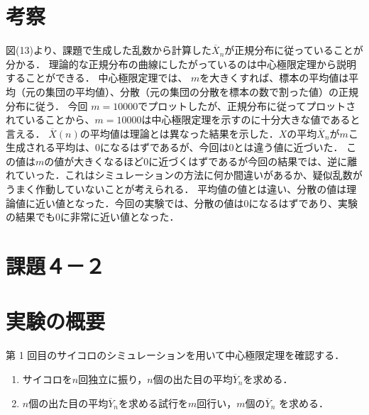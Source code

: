 \documentclass[fleqn, a4paper. 12pt]{ltjsarticle} %
\begin{document}
\section*{考察}
図(13)より、課題で生成した乱数から計算した$\overline{X}_n$が正規分布に従っていることが分かる．
理論的な正規分布の曲線にしたがっているのは中心極限定理から説明することができる．
中心極限定理では、 $m$を大きくすれば、標本の平均値は平均（元の集団の平均値）、分散（元の集団の分散を標本の数で割った値）の正規分布に従う．
今回 $m= 10000$でプロットしたが、正規分布に従ってプロットされていることから、$m=10000$は中心極限定理を示すのに十分大きな値であると言える．
$\overline{X}(n)$の平均値は理論とは異なった結果を示した．$X$の平均$\overline{X}_n$が$m$こ生成される平均は、$0$になるはずであるが、今回は$0$とは違う値に近づいた．
この値は$m$の値が大きくなるほど$0$に近づくはずであるが今回の結果では、逆に離れていった．これはシミュレーションの方法に何か間違いがあるか、疑似乱数がうまく作動していないことが考えられる．
平均値の値とは違い、分散の値は理論値に近い値となった．今回の実験では、分散の値は$0$になるはずであり、実験の結果でも$0$に非常に近い値となった．
\newpage
\section*{課題４－２}
\section*{実験の概要}
第 1 回目のサイコロのシミュレーションを用いて中心極限定理を確認する．
\begin{enumerate}
  \item サイコロを$n$回独立に振り，$n$個の出た目の平均$\overline{Y}_n$を求める．
  \item $n$個の出た目の平均$\overline{Y}_n$を求める試行を$m$回行い，$m$個の$\overline{Y}_n$ を求める．
\end{enumerate}
\end{document}
